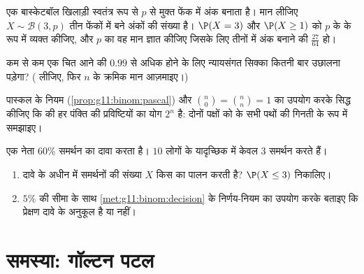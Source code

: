 \begin{exercise}[$\star\star$]\label{exo:g11:binom:8}
एक बास्केटबॉल खिलाड़ी स्वतंत्र रूप से  $p$ से मुक्त फेंक में अंक
बनाता है। मान लीजिए $X \sim \mathcal B(3, p)$ तीन फेंकों में बने अंकों की संख्या है। $\P(X = 3)$ और
$\P(X \geq 1)$ को $p$ के  के रूप में व्यक्त कीजिए, और $p$ का वह मान ज्ञात
कीजिए जिसके लिए तीनों में अंक बनाने की  $\frac{27}{64}$ हो।
\end{exercise}

\begin{exercise}[$\star\star$]\label{exo:g11:binom:9}
कम से कम एक चित आने की  $0.99$ से अधिक होने के लिए न्यायसंगत सिक्का
कितनी बार उछालना पड़ेगा? ( लीजिए, फिर $n$ के क्रमिक मान आज़माइए।)
\end{exercise}

\begin{exercise}[$\star\star$]\label{exo:g11:binom:10}
पास्कल के नियम (\cref{prop:g11:binom:pascal}) और $\binom n0 = \binom nn = 1$ का उपयोग करके सिद्ध कीजिए कि 
की हर पंक्ति की प्रविष्टियों का योग $2^n$ है: दोनों पक्षों को  के सभी
पथों की गिनती के रूप में समझाइए।
\end{exercise}

\begin{exercise}[$\star\star\star$]\label{exo:g11:binom:11}
एक नेता $60\%$ समर्थन का दावा करता है। $10$ लोगों के यादृच्छिक  में
केवल $3$ समर्थन करते हैं।
\begin{enumerate}
  \item दावे के अधीन  में समर्थनों की संख्या $X$ किस  का
        पालन करती है? $\P(X \leq 3)$ निकालिए।
  \item $5\%$ की सीमा के साथ \cref{met:g11:binom:decision} के निर्णय-नियम का उपयोग करके बताइए कि
        प्रेक्षण दावे के अनुकूल है या नहीं।
\end{enumerate}
\end{exercise}

\section{समस्या: गॉल्टन पटल}

